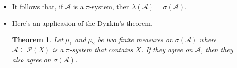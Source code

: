\documentclass[10pt]{article}
\newtheorem{theorem}[lemma]{Theorem}
\newcommand{\mcal}[1]{\mathcal{#1}}
\begin{document}
\begin{itemize}
\begin{proof}
    Now,
    \begin{align*}
      A \in \mcal{A} &\implies \lambda(\mcal{A}) \subseteq \mcal{G}_A \\
      A \in \mcal{A} &\implies (B \in \lambda(\mcal{A}) \implies B \in \mcal{G}_A) \\
      (A \in \mcal{A}) \wedge (B \in \lambda(\mcal{A})) &\implies B \in \mcal{G}_A.
    \end{align*}
    Because $B \in \mcal{G}_A$ iff $A \in \mcal{G}_B$, it follows that:
    \begin{align*}
      (A \in \mcal{A}) \wedge (B \in \lambda(\mcal{A})) &\implies A \in \mcal{G}_B \\
      B \in \lambda(\mcal{A}) &\implies (A \in \mcal{A} \implies A \in \mcal{G}_B) \\
      B \in \lambda(\mcal{A}) &\implies \mcal{A} \subseteq \mcal{G}_B.
    \end{align*}
    Because $\mcal{G}_B$ is a $\lambda$-system, it follows that $\lambda(\mcal{A}) \subseteq \mcal{G}_B$. So, 
    \begin{align*}
      B \in \lambda(\mcal{A}) \implies \lambda(\mcal{A}) \subseteq \mcal{G}_B.
    \end{align*}
    Hence,    
    \begin{align*}      
      A \in \lambda(\mcal{A}) \wedge B \in \lambda(\mcal{A}) 
      &\implies A \in \lambda(\mcal{A}) \wedge \lambda(\mcal{A}) \subseteq \mcal{G}_B \\
      A \in \lambda(\mcal{A}) \wedge B \in \lambda(\mcal{A})
      &\implies A \in \mcal{G}_B \\
      A \in \lambda(\mcal{A}) \wedge B \in \lambda(\mcal{A}) 
      &\implies A \cap B \in \lambda(\mcal{A}) \\
      A, B \in \lambda(\mcal{A}) 
      &\implies A \cap B \in \lambda(\mcal{A}).
    \end{align*}    
    It follows that $\lambda(A)$ is a $\pi$-system, and thus a $\sigma$-algebra.
  \end{proof}
  
  \item It follows that, if $\mcal{A}$ is a $\pi$-system, then $\lambda(\mcal{A}) = \sigma(\mcal{A})$.
  
  \item Here's an application of the Dynkin's theorem.
  
  \begin{theorem}
    Let $\mu_1$ and $\mu_2$ be two finite measures on $\sigma(\mcal{A})$ where $\mcal{A} \subseteq \mcal{P}(X)$ is a $\pi$-system that contains $X$. If they agree on $\mcal{A}$, then they also agree on $\sigma(\mcal{A})$.
  \end{theorem}


\end{itemize}
\end{document}

